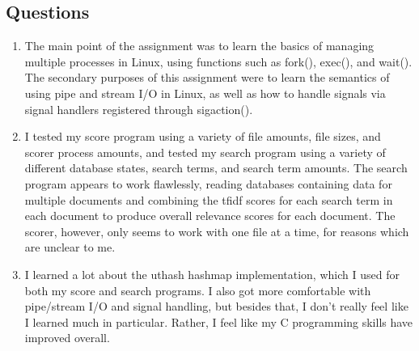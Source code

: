 \documentclass[letterpaper,10pt,fleqn]{article}
\numberwithin{equation}{section}
\begin{document}
\subsection*{Questions}
\begin{enumerate}
    \item The main point of the assignment was to learn the basics of managing multiple processes in Linux, using functions such as fork(), exec(), and wait().  The secondary purposes of this assignment were to learn the semantics of using pipe and stream I/O in Linux, as well as how to handle signals via signal handlers registered through sigaction().
    \item I tested my score program using a variety of file amounts, file sizes, and scorer process amounts, and tested my search program using a variety of different database states, search terms, and search term amounts.  The search program appears to work flawlessly, reading databases containing data for multiple documents and combining the tfidf scores for each search term in each document to produce overall relevance scores for each document.  The scorer, however, only seems to work with one file at a time, for reasons which are unclear to me.
    \item I learned a lot about the uthash hashmap implementation, which I used for both my score and search programs.  I also got more comfortable with pipe/stream I/O and signal handling, but besides that, I don't really feel like I learned much in particular.  Rather, I feel like my C programming skills have improved overall.
\end{enumerate}
\end{document}

